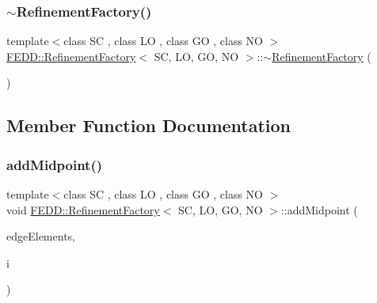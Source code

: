 \mbox{\label{classFEDD_1_1RefinementFactory_ae9b8ba9b12e35db03ef1b6363c1b9200}} 
\subsubsection{\texorpdfstring{$\sim$\+Refinement\+Factory()}{~RefinementFactory()}}
{\footnotesize\ttfamily template$<$class SC , class LO , class GO , class NO $>$ \\
\hyperlink{classFEDD_1_1RefinementFactory}{F\+E\+D\+D\+::\+Refinement\+Factory}$<$ SC, LO, GO, NO $>$\+::$\sim$\hyperlink{classFEDD_1_1RefinementFactory}{Refinement\+Factory} (\begin{DoxyParamCaption}{ }\end{DoxyParamCaption})}



\subsection{Member Function Documentation}
\mbox{\label{classFEDD_1_1RefinementFactory_af40b1acc9353be1408fed4d6a61ed2ae}} 
\subsubsection{\texorpdfstring{add\+Midpoint()}{addMidpoint()}}
{\footnotesize\ttfamily template$<$class SC , class LO , class GO , class NO $>$ \\
void \hyperlink{classFEDD_1_1RefinementFactory}{F\+E\+D\+D\+::\+Refinement\+Factory}$<$ SC, LO, GO, NO $>$\+::add\+Midpoint (\begin{DoxyParamCaption}\item[{\hyperlink{classFEDD_1_1RefinementFactory_ae5285e990ec4632d6188a1280627ad13}{Edge\+Elements\+Ptr\+\_\+\+Type}}]{edge\+Elements,  }\item[{int}]{i }\end{DoxyParamCaption})}

